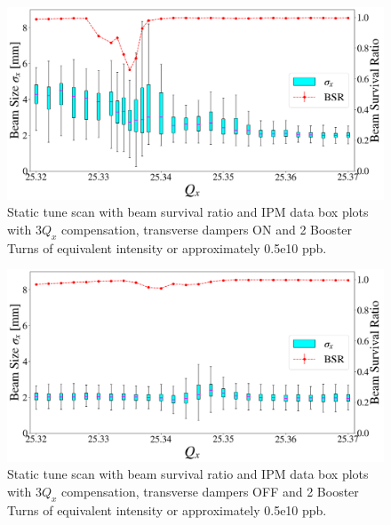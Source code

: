 \begin{figure}[H]
    \centering
    \includegraphics[width=\columnwidth]{chapter6/static2turns_ipm_dampersON.png}
    \caption{Static tune scan with beam survival ratio and IPM data box plots with $3Q_x$ compensation, transverse dampers ON and 2 Booster Turns of equivalent intensity or approximately 0.5e10 ppb.}
    \label{fig:static2_dampersON}
\end{figure}

\begin{figure}[H]
    \centering
    \includegraphics[width=\columnwidth]{chapter6/static2turns_ipm_dampersOFF.png}
    \caption{Static tune scan with beam survival ratio and IPM data box plots with $3Q_x$ compensation, transverse dampers OFF and 2 Booster Turns of equivalent intensity or approximately 0.5e10 ppb.}
    \label{fig:static2_dampersOFF}
\end{figure}

